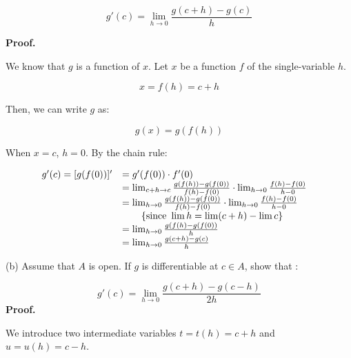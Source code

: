 \documentclass[10pt]{article}
\begin{document}
\begin{equation*}
g'( c) =\lim _{h\rightarrow 0}\frac{g( c+h) -g( c)}{h}
\end{equation*}


\textbf{Proof.}



We know that $\displaystyle g$ is a function of $\displaystyle x$. Let $\displaystyle x$ be a function $\displaystyle f$ of the single-variable $\displaystyle h$.


\begin{equation*}
x=f( h) =c+h
\end{equation*}


Then, we can write $\displaystyle g$ as:


\begin{equation*}
g( x) =g( f( h))
\end{equation*}


When $\displaystyle x=c$, $\displaystyle h=0$. By the chain rule:


\begin{equation*}
\begin{array}{ c l c }
g'( c) =[ g( f( 0))] ' & =g'( f( 0)) \cdot f'( 0) & \\
 & =\lim _{c+h\rightarrow c}\frac{g( f( h)) -g( f( 0))}{f( h) -f( 0)} \cdot \lim _{h\rightarrow 0}\frac{f( h) -f( 0)}{h-0} & \\
 & =\lim _{h\rightarrow 0}\frac{g( f( h)) -g( f( 0))}{f( h) -f( 0)} \cdot \lim _{h\rightarrow 0}\frac{f( h) -f( 0)}{h-0} & \\
 & \quad \quad \left\{\text{since} \ \lim h=\lim ( c+h) -\lim c\right\} & \\
 & =\lim _{h\rightarrow 0}\frac{g( f( h) -g( f( 0))}{h} & \\
 & =\lim _{h\rightarrow 0}\frac{g( c+h) -g( c)}{h} & 
\end{array}
\end{equation*}




(b) Assume that $\displaystyle A$ is open. If $\displaystyle g$ is differentiable at $\displaystyle c\in A$, show that :


\begin{equation*}
g'( c) =\lim _{h\rightarrow 0}\frac{g( c+h) -g( c-h)}{2h}
\end{equation*}
\textbf{Proof.}



We introduce two intermediate variables $\displaystyle t=t( h) =c+h$ and $\displaystyle u=u( h) =c-h$.
\end{document}

